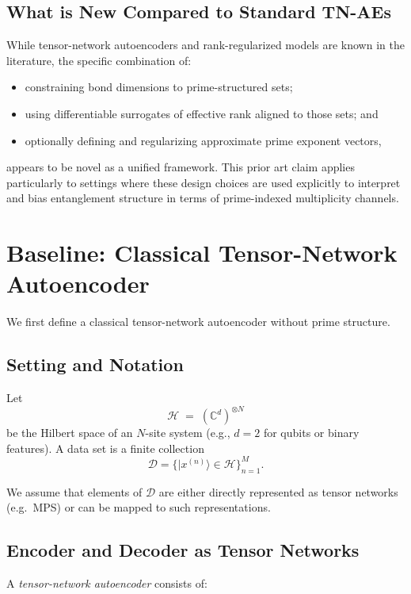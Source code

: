\documentclass[11pt]{article}
\begin{document}
\subsection{What is New Compared to Standard TN-AEs}

While tensor-network autoencoders and rank-regularized models are known in the literature, the specific combination of:

\begin{itemize}[leftmargin=1.5em]
    \item constraining bond dimensions to prime-structured sets;
    \item using differentiable surrogates of effective rank aligned to those sets; and
    \item optionally defining and regularizing approximate prime exponent vectors,
\end{itemize}
appears to be novel as a unified framework. This prior art claim applies particularly to settings where these design choices are used explicitly to interpret and bias entanglement structure in terms of prime-indexed multiplicity channels.

\section{Baseline: Classical Tensor-Network Autoencoder}

We first define a classical tensor-network autoencoder without prime structure.

\subsection{Setting and Notation}

Let
\[
\mathcal{H} \;=\; (\mathbb{C}^d)^{\otimes N}
\]
be the Hilbert space of an $N$-site system (e.g., $d=2$ for qubits or binary features). A data set is a finite collection
\[
\mathcal{D} = \{\lvert x^{(n)} \rangle \in \mathcal{H}\}_{n=1}^M.
\]

We assume that elements of $\mathcal{D}$ are either directly represented as tensor networks (e.g.\ MPS) or can be mapped to such representations.

\subsection{Encoder and Decoder as Tensor Networks}

A \emph{tensor-network autoencoder} consists of:
\end{document}
